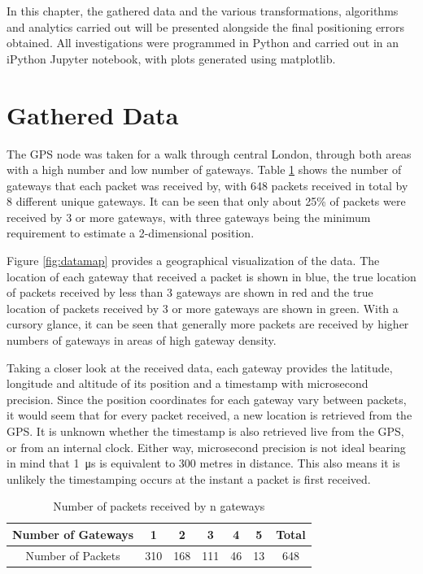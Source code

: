 \documentclass[a4paper]{report}
\begin{document}
  In this chapter, the gathered data and the various transformations, algorithms and analytics carried out will be presented alongside the final positioning errors obtained. All investigations were programmed in Python and carried out in an iPython Jupyter notebook, with plots generated using matplotlib.

  \section{Gathered Data}

    The GPS node was taken for a walk through central London, through both areas with a high number and low number of gateways. Table \ref{tab:gatewaynums} shows the number of gateways that each packet was received by, with 648 packets received in total by 8 different unique gateways. It can be seen that only about 25\% of packets were received by 3 or more gateways, with three gateways being the minimum requirement to estimate a 2-dimensional position.

    Figure \ref{fig:datamap} provides a geographical visualization of the data. The location of each gateway that received a packet is shown in blue, the true location of packets received by less than 3 gateways are shown in red and the true location of packets received by 3 or more gateways are shown in green. With a cursory glance, it can be seen that generally more packets are received by higher numbers of gateways in areas of high gateway density.

    Taking a closer look at the received data, each gateway provides the latitude, longitude and altitude of its position and a timestamp with microsecond precision. Since the position coordinates for each gateway vary between packets, it would seem that for every packet received, a new location is retrieved from the GPS. It is unknown whether the timestamp is also retrieved live from the GPS, or from an internal clock. Either way, microsecond precision is not ideal bearing in mind that \SI{1}{\micro\second} is equivalent to 300 metres in distance. This also means it is unlikely the timestamping occurs at the instant a packet is first received.

    \begin{table}[ht]
      \begin{center}
        \caption{Number of packets received by n gateways}
        \label{tab:gatewaynums}
        \begin{tabular}{|c|c|c|c|c|c|c|}
          \hline
          Number of Gateways & 1 & 2 & 3 & 4 & 5 & Total \\
          \hline
          Number of Packets & 310 & 168 & 111 & 46 & 13 & 648 \\
          \hline
        \end{tabular}
      \end{center}
    \end{table}
\end{document}
